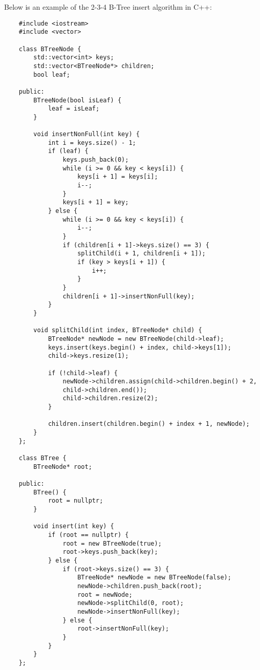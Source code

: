 \begin{solution}
    Below is an example of the 2-3-4 B-Tree insert algorithm in C++:

    \horizontalline

    \begin{verbatim}
    #include <iostream>
    #include <vector>
    
    class BTreeNode {
        std::vector<int> keys;
        std::vector<BTreeNode*> children;
        bool leaf;
    
    public:
        BTreeNode(bool isLeaf) {
            leaf = isLeaf;
        }
    
        void insertNonFull(int key) {
            int i = keys.size() - 1;
            if (leaf) {
                keys.push_back(0);
                while (i >= 0 && key < keys[i]) {
                    keys[i + 1] = keys[i];
                    i--;
                }
                keys[i + 1] = key;
            } else {
                while (i >= 0 && key < keys[i]) {
                    i--;
                }
                if (children[i + 1]->keys.size() == 3) {
                    splitChild(i + 1, children[i + 1]);
                    if (key > keys[i + 1]) {
                        i++;
                    }
                }
                children[i + 1]->insertNonFull(key);
            }
        }
    
        void splitChild(int index, BTreeNode* child) {
            BTreeNode* newNode = new BTreeNode(child->leaf);
            keys.insert(keys.begin() + index, child->keys[1]);
            child->keys.resize(1);
    
            if (!child->leaf) {
                newNode->children.assign(child->children.begin() + 2, 
                child->children.end());
                child->children.resize(2);
            }
    
            children.insert(children.begin() + index + 1, newNode);
        }
    };
    
    class BTree {
        BTreeNode* root;
    
    public:
        BTree() {
            root = nullptr;
        }
    
        void insert(int key) {
            if (root == nullptr) {
                root = new BTreeNode(true);
                root->keys.push_back(key);
            } else {
                if (root->keys.size() == 3) {
                    BTreeNode* newNode = new BTreeNode(false);
                    newNode->children.push_back(root);
                    root = newNode;
                    newNode->splitChild(0, root);
                    newNode->insertNonFull(key);
                } else {
                    root->insertNonFull(key);
                }
            }
        }
    };
    

\end{verbatim}
\end{solution}
